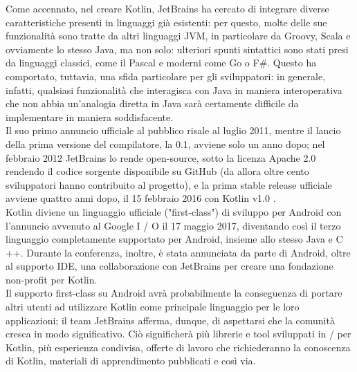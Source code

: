 Come accennato, nel creare Kotlin, JetBrains ha cercato di integrare diverse caratteristiche presenti in linguaggi già esistenti: per questo, molte delle sue funzionalità sono tratte da altri linguaggi JVM, in particolare da Groovy, Scala e ovviamente lo stesso Java, ma non solo: ulteriori spunti sintattici sono stati presi da linguaggi classici, come il Pascal e moderni come Go o F\#. Questo ha comportato, tuttavia, una sfida particolare per gli sviluppatori: in generale, infatti, qualsiasi funzionalità che interagisca con Java in maniera interoperativa che non abbia un'analogia diretta in Java sarà certamente difficile da implementare in maniera soddisfacente.\\

Il suo primo annuncio ufficiale al pubblico risale al luglio 2011, mentre il lancio della prima versione del compilatore, la 0.1, avviene solo un anno dopo; nel febbraio 2012 JetBrains lo rende open-source, sotto la licenza Apache 2.0 rendendo il codice sorgente disponibile su GitHub \cite{ktGitHub} (da allora oltre cento sviluppatori hanno contribuito al progetto), e la prima stable release ufficiale avviene quattro anni dopo, il 15 febbraio 2016 con Kotlin v1.0 \cite{kotlinv1.0}.\\
Kotlin diviene un linguaggio ufficiale ("first-class") di sviluppo per Android con l'annuncio \cite{kotlinOfficialAndroid} avvenuto al Google I / O \cite{googleio} il 17 maggio 2017, diventando così il terzo linguaggio completamente supportato per Android, insieme allo stesso Java e C ++. Durante la conferenza, inoltre, è stata annunciata da parte di Android, oltre al supporto IDE, una collaborazione con JetBrains per creare una fondazione non-profit per Kotlin. \\
Il supporto first-class su Android avrà probabilmente la conseguenza di portare altri utenti ad utilizzare Kotlin come principale linguaggio per le loro applicazioni; il team JetBrains afferma, dunque, di aspettarsi che la comunità cresca in modo significativo. Ciò significherà più librerie e tool sviluppati in / per Kotlin, più esperienza condivisa, offerte di lavoro che richiederanno la conoscenza di Kotlin, materiali di apprendimento pubblicati e così via.\\

